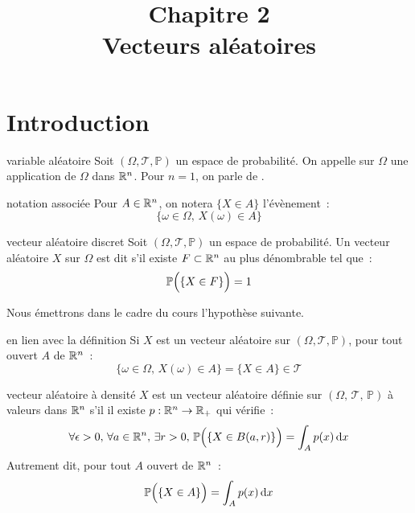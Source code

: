 

\setcounter{chapitre}{2}

\title{\Large Chapitre 2 \\ \Huge Vecteurs aléatoires}



\maketitle


\newcommand{\tribu}[0]{\mathcal{T}}
\newcommand{\univ}[0]{\Omega}
\newcommand{\proba}[0]{\mathbb{P}}
\newcommand{\probaset}[1]{\mathbb{P}\Big(\{#1\}\Big)}



\section{Introduction}
\begin{definition}{}{variable aléatoire}
    Soit $(\univ, \tribu, \proba)$ un espace de probabilité. On appelle  sur $\univ$ une application de $\univ$ dans $\mathbb{R}^n$.
    Pour $n=1$, on parle de .
\end{definition}

\begin{remarque}{}{notation associée}
    Pour $A \in \mathbb{R}^n$, on notera $\{X \in A\}$ l'évènement~:
    $$\{\omega \in \univ,\, X(\omega) \in A\}$$
\end{remarque}

\begin{definition}{}{vecteur aléatoire discret}
    Soit $(\univ, \tribu, \proba)$ un espace de probabilité. Un vecteur aléatoire $X$ sur $\Omega$ est dit  s'il existe $F \subset \mathbb{R}^n$ au plus dénombrable tel que~:
    $$\proba\Bigl(\{X \in F\}\Bigr) = 1$$
    
\end{definition}


Nous émettrons dans le cadre du cours l'hypothèse suivante.
\begin{remarque}{}{en lien avec la définition}
    Si $X$ est un vecteur aléatoire sur $(\univ, \tribu, \proba)$, pour tout ouvert $A$ de $\mathbb{R}^n$~:
    $$\{\omega \in \univ,\, X(\omega) \in A\} = \{X \in A\} \in \tribu$$
\end{remarque}

\begin{definition}{}{vecteur aléatoire à densité}
    $X$ est un vecteur aléatoire définie sur $(\univ,\, \tribu,\, \proba)$ à valeurs dans $\mathbb{R}^n$ s'il il existe $p : \mathbb{R}^n \to \mathbb{R}_+$ qui vérifie~:
    $$\forall \epsilon > 0,\, \forall a \in \R^n,\, \exists r > 0,\, \proba\Bigl(\{X \in B(a, r)\}\Bigr) = \int_A p(x)\d{x}$$
    Autrement dit, pour tout $A$ ouvert de $\mathbb{R}^n$~:
    $$\proba\Big(\{X \in A\}\Big) = \int_A p(x)\d{x}$$
\end{definition}


